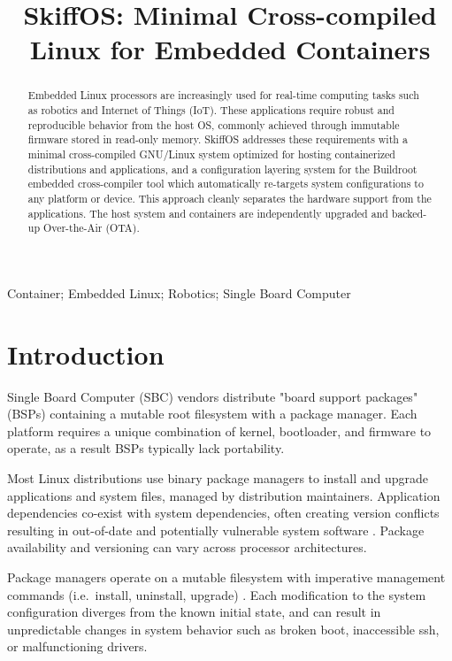 \documentclass[english,]{IEEEtran}
\title{SkiffOS: Minimal Cross-compiled Linux for Embedded Containers}
\author{
            \IEEEauthorblockN{Christian Stewart}
        \IEEEauthorblockA{%
             \\
            Aperture Robotics LLC. \\
            christian@aperturerobotics.com}
        }
\date{}
\begin{document}
\maketitle
\begin{abstract}
Embedded Linux processors are increasingly used for real-time computing
tasks such as robotics and Internet of Things (IoT). These applications
require robust and reproducible behavior from the host OS, commonly
achieved through immutable firmware stored in read-only memory. SkiffOS
addresses these requirements with a minimal cross-compiled GNU/Linux
system optimized for hosting containerized distributions and
applications, and a configuration layering system for the Buildroot
embedded cross-compiler tool which automatically re-targets system
configurations to any platform or device. This approach cleanly
separates the hardware support from the applications. The host system
and containers are independently upgraded and backed-up Over-the-Air
(OTA).
\end{abstract}

\begin{IEEEkeywords}
    Container;
    Embedded Linux;
    Robotics;
    Single Board Computer\end{IEEEkeywords}

\hypertarget{introduction}{%
\section{Introduction}\label{introduction}}

Single Board Computer (SBC) vendors distribute "board support packages"
(BSPs) containing a mutable root filesystem with a package manager. Each
platform requires a unique combination of kernel, bootloader, and
firmware to operate, as a result BSPs typically lack portability.

Most Linux distributions use binary package managers to install and
upgrade applications and system files, managed by distribution
maintainers. Application dependencies co-exist with system dependencies,
often creating version conflicts resulting in out-of-date and
potentially vulnerable system software \autocite{foss}. Package
availability and versioning can vary across processor architectures.

Package managers operate on a mutable filesystem with imperative
management commands (i.e.~install, uninstall, upgrade) \autocite{nixos}.
Each modification to the system configuration diverges from the known
initial state, and can result in unpredictable changes in system
behavior such as broken boot, inaccessible ssh, or malfunctioning
drivers.
\end{document}
